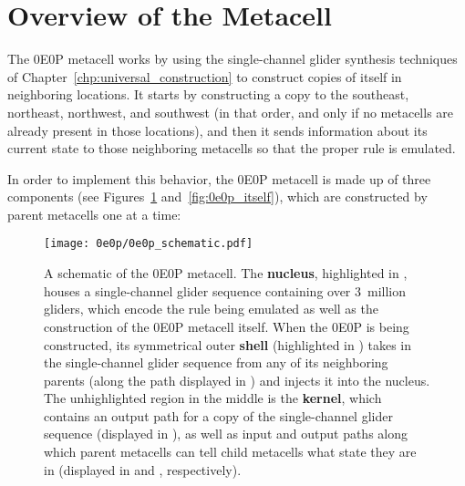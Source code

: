 \section{Overview of the Metacell}\label{sec:0e0p_structure}

The 0E0P metacell works by using the single-channel glider synthesis techniques of Chapter~\ref{chp:universal_construction} to construct copies of itself in neighboring locations. It starts by constructing a copy to the southeast, northeast, northwest, and southwest (in that order, and only if no metacells are already present in those locations), and then it sends information about its current state to those neighboring metacells so that the proper rule is emulated.

In order to implement this behavior, the 0E0P metacell is made up of three components (see Figures~\ref{fig:0e0p_schematic} and~\ref{fig:0e0p_itself}), which are constructed by parent metacells one at a time:\smallskip

\begin{figure}[!htb]
	\centering
	\texttt{[image: 0e0p/0e0p\_schematic.pdf]}
	\caption{A schematic of the 0E0P metacell. The \textbf{nucleus}, highlighted in , houses a single-channel glider sequence containing over 3~million gliders, which encode the rule being emulated as well as the construction of the 0E0P metacell itself. When the 0E0P is being constructed, its symmetrical outer \textbf{shell} (highlighted in ) takes in the single-channel glider sequence from any of its neighboring parents (along the path displayed in ) and injects it into the nucleus. The unhighlighted region in the middle is the \textbf{kernel}, which contains an output path for a copy of the single-channel glider sequence (displayed in ), as well as input and output paths along which parent metacells can tell child metacells what state they are in (displayed in  and , respectively).}\label{fig:0e0p_schematic}
\end{figure}


